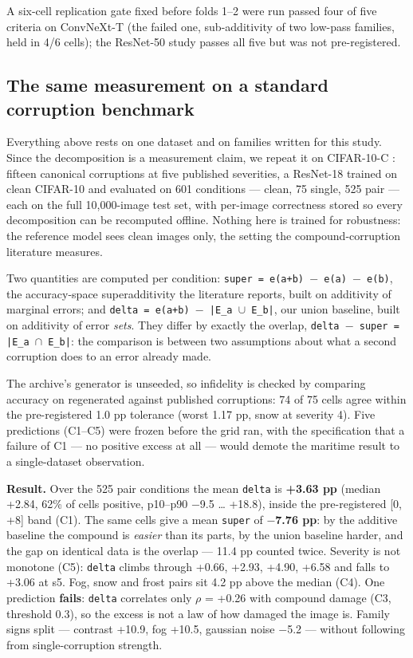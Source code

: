 A six-cell replication gate fixed before folds 1--2 were run passed four of five criteria on ConvNeXt-T (the failed one, sub-additivity of two low-pass families, held in 4/6 cells); the ResNet-50 study passes all five but was not pre-registered.

\subsection{The same measurement on a standard corruption benchmark}
Everything above rests on one dataset and on families written for this study. Since the decomposition is a measurement claim, we repeat it on CIFAR-10-C \cite{hendrycks2019imagenetc}: fifteen canonical corruptions at five published severities, a ResNet-18 \cite{he2016resnet} trained on clean CIFAR-10 \cite{krizhevsky2009cifar} and evaluated on 601 conditions --- clean, 75 single, 525 pair --- each on the full 10,000-image test set, with per-image correctness stored so every decomposition can be recomputed offline. Nothing here is trained for robustness: the reference model sees clean images only, the setting the compound-corruption literature measures.

Two quantities are computed per condition: \texttt{super = e(a+b) $-$ e(a) $-$ e(b)}, the accuracy-space superadditivity the literature reports, built on additivity of marginal errors; and \texttt{delta = e(a+b) $-$ |E\_a $\cup$ E\_b|}, our union baseline, built on additivity of error \emph{sets}. They differ by exactly the overlap, \texttt{delta $-$ super = |E\_a $\cap$ E\_b|}: the comparison is between two assumptions about what a second corruption does to an error already made.

The archive's generator is unseeded, so infidelity is checked by comparing accuracy on regenerated against published corruptions: 74 of 75 cells agree within the pre-registered 1.0 pp tolerance (worst 1.17 pp, snow at severity 4). Five predictions (C1--C5) were frozen before the grid ran, with the specification that a failure of C1 --- no positive excess at all --- would demote the maritime result to a single-dataset observation.

\textbf{Result.} Over the 525 pair conditions the mean \texttt{delta} is \textbf{+3.63 pp} (median +2.84, 62\% of cells positive, p10--p90 $-$9.5 … +18.8), inside the pre-registered [0, +8] band (C1). The same cells give a mean \texttt{super} of \textbf{$-$7.76 pp}: by the additive baseline the compound is \emph{easier} than its parts, by the union baseline harder, and the gap on identical data is the overlap --- 11.4 pp counted twice. Severity is not monotone (C5): \texttt{delta} climbs through +0.66, +2.93, +4.90, +6.58 and falls to +3.06 at s5. Fog, snow and frost pairs sit 4.2 pp above the median (C4). One prediction \textbf{fails}: \texttt{delta} correlates only $\rho$ = +0.26 with compound damage (C3, threshold 0.3), so the excess is not a law of how damaged the image is. Family signs split --- contrast +10.9, fog +10.5, gaussian noise $-$5.2 --- without following from single-corruption strength.

